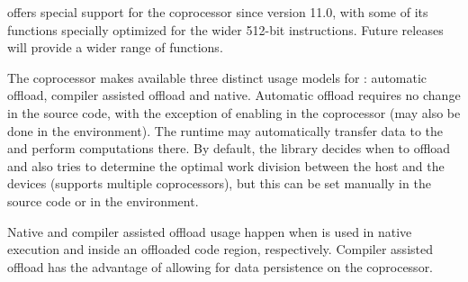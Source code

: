 \documentclass[../thesis]{subfiles}
\begin{document}
	\intel\mkl offers special support for the \intel\xeonphi coprocessor since version 11.0, with some of its functions specially optimized for the wider 512-bit \simd instructions. Future releases will provide a wider range of functions.

	The coprocessor makes available three distinct usage models for \mkl: automatic offload, compiler assisted offload and native. Automatic offload requires no change in the source code, with the exception of enabling \mkl in the coprocessor (may also be done in the environment). The runtime may automatically transfer data to the \xeonphi and perform computations there. By default, the library decides when to offload and also tries to determine the optimal work division between the host and the devices (\mkl supports multiple coprocessors), but this can be set manually in the source code or in the environment.

	Native and compiler assisted offload usage happen when \mkl is used in native execution and inside an offloaded code region, respectively. Compiler assisted offload has the advantage of allowing for data persistence on the coprocessor.
\end{document}
